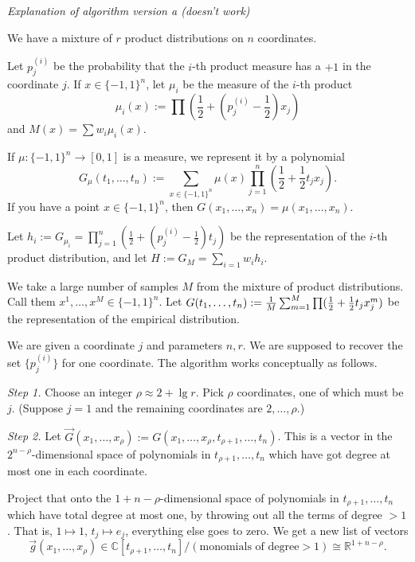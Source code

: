 \documentclass{amsart}
\begin{document}
\long{}
\begin{center}\it {Explanation of algorithm version a (doesn't work)}\end{center}

  We have a mixture of $r$ product distributions on $n$ coordinates.

  Let $p^{(i)}_j$ be the probability that the $i$-th product measure has a $+1$ in the coordinate $j$. If $x \in \{-1, 1\}^n$, let $\mu_i$ be the measure of the $i$-th product $$\mu_i(x) := \prod \left(\frac12 + \left(p^{(i)}_j - \frac12\right) x_j\right)$$
  and $M(x) = \sum w_i \mu_i(x)$.

  If $\mu: \{-1, 1\}^n \to [0, 1]$ is a measure, we represent it by a polynomial $$G_\mu(t_1, \ldots, t_n) := \sum_{x \in \{-1, 1\}^n} \mu(x) \prod_{j=1}^n \left(\frac12 + \frac12 t_j x_j\right).$$ If you have a point $x \in \{-1, 1\}^n$, then $G(x_1, \ldots, x_n) = \mu(x_1, \ldots, x_n)$.

  Let $h_i := G_{\mu_i} = \prod_{j=1}^n \left(\frac12 + (p^{(i)}_j - \frac12) t_j\right)$ be the representation of the $i$-th product distribution, and let $H := G_M =  \sum_{i=1} w_i h_i$.

  We take a large number of samples $M$ from the mixture of product distributions. Call them $x^1, \ldots, x^M \in \{-1, 1\}^n$. Let $G(t_1, \ldots, t_n) := {1 \over M} \sum_{m=1}^M \prod (\frac12 + \frac12 t_j x^m_j)$ be the representation of the empirical distribution.

We are given a coordinate $j$ and parameters $n, r$. We are supposed to recover the set $\{p^{(i)}_j\}$ for one coordinate. The algorithm works conceptually as follows.

\vspace{1em}
\emph{Step 1.}  Choose an integer $\rho \approx 2 + \lg r$. Pick $\rho$ coordinates, one of which must be $j$. (Suppose $j = 1$ and the remaining coordinates are $2, \ldots, \rho$.)

\emph{ Step 2.} Let $\vec G(x_1, \ldots, x_\rho) := G(x_1, \ldots, x_{\rho}, t_{\rho + 1}, \ldots, t_{n})$. This is a vector in the $2^{n - \rho}$-dimensional space of polynomials in $t_{\rho + 1}, \ldots, t_n$ which have got degree at most one in each coordinate.

Project that onto the $1+n-\rho$-dimensional space of polynomials in $t_{\rho+1}, \ldots, t_n$ which have total degree at most one, by throwing out all the terms of degree $>1$. That is, $1 \mapsto 1$, $t_j \mapsto e_{j}$, everything else goes to zero. We get a new list of vectors $$\vec g(x_1, \ldots, x_\rho) \in \mathbb C[t_{\rho + 1}, \ldots, t_n]/(\text{monomials of degree} > 1) \cong \mathbb R^{1+n - \rho}.$$
\end{document}
